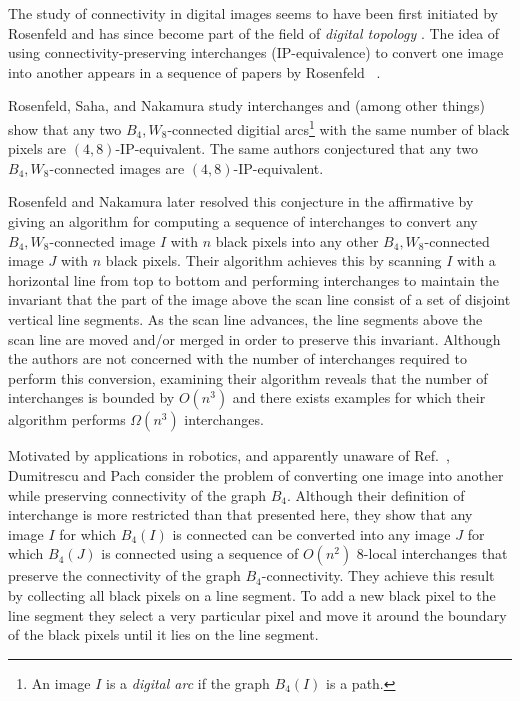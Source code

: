 \documentclass[lotsofwhite,charterfonts]{patmorin}
\begin{document}
The study of connectivity in digital images seems to have been first
initiated by Rosenfeld \cite{r70,r73,r74} and has since become part of
the field of \emph{digital topology} \cite{hr96,kr89}.  The idea of
using connectivity-preserving interchanges (IP-equivalence) to convert
one image into another appears in a sequence of papers by Rosenfeld
\etal\ \cite{rkn98,rn02,rsn01}.

Rosenfeld, Saha, and Nakamura \cite{rsn01} study interchanges and
(among other things) show that any two $B_4,W_8$-connected digitial
arcs\footnote{An image $I$ is a \emph{digital arc} if the graph
$B_4(I)$ is a path.} with the same number of black pixels are
$(4,8)$-IP-equivalent. The same authors conjectured that any two
$B_4,W_8$-connected images are $(4,8)$-IP-equivalent.

Rosenfeld and Nakamura \cite{rn02} later resolved this conjecture in
the affirmative by giving an algorithm for computing a sequence of
interchanges to convert any $B_4,W_8$-connected image $I$ with $n$
black pixels into any other $B_4,W_8$-connected image $J$ with $n$
black pixels. Their algorithm achieves this by scanning $I$ with a
horizontal line from top to bottom and performing interchanges to
maintain the invariant that the part of the image above the scan line
consist of a set of disjoint vertical line segments. As the scan line
advances, the line segments above the scan line are moved and/or
merged in order to preserve this invariant.   Although the authors are
not concerned with the number of interchanges required to perform this
conversion, examining their algorithm reveals that the number of
interchanges is bounded by $O(n^3)$ and there exists examples for
which their algorithm performs $\Omega(n^3)$ interchanges.

Motivated by applications in robotics, and apparently unaware of
Ref.~\cite{rn02}, Dumitrescu and Pach \cite{dp04} consider the problem
of converting one image into another while preserving connectivity of
the graph $B_4$.  Although their definition of interchange is more
restricted than that presented here, they show that any image $I$ for
which $B_4(I)$ is connected can be converted into any image $J$ for
which $B_4(J)$ is connected using a sequence of $O(n^2)$ 8-local
interchanges that preserve the connectivity of the graph
$B_4$-connectivity.  They achieve this result by collecting all black
pixels on a line segment.  To add a new black pixel to the line
segment they select a very particular pixel and move it around the
boundary of the black pixels until it lies on the line segment.
\end{document}
